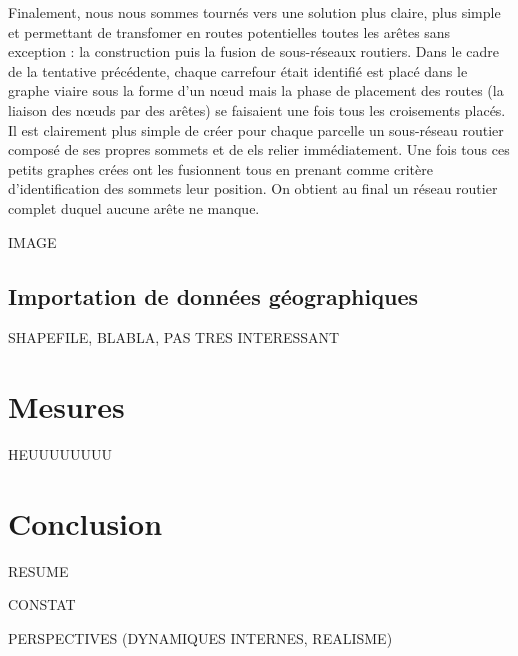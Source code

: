 \documentclass[12pt]{article}
\begin{document}
Finalement, nous nous sommes tournés vers une solution plus claire,
plus simple et permettant de transfomer en routes potentielles toutes
les arêtes sans exception : la construction puis la fusion de
sous-réseaux routiers. Dans le cadre de la tentative précédente,
chaque carrefour était identifié est placé dans le graphe viaire sous
la forme d'un n\oe ud mais la phase de placement des routes (la
liaison des n\oe uds par des arêtes) se faisaient une fois tous les
croisements placés. Il est clairement plus simple de créer pour chaque
parcelle un sous-réseau routier composé de ses propres sommets et de
els relier immédiatement. Une fois tous ces petits graphes crées ont
les fusionnent tous en prenant comme critère d'identification des
sommets leur position. On obtient au final un réseau routier complet
duquel aucune arête ne manque.

IMAGE

\subsection{Importation de données géographiques}

SHAPEFILE, BLABLA, PAS TRES INTERESSANT

\section{Mesures}

HEUUUUUUUU

\section{Conclusion}

RESUME

CONSTAT

PERSPECTIVES (DYNAMIQUES INTERNES, REALISME)

\printbibliography
\end{document}
